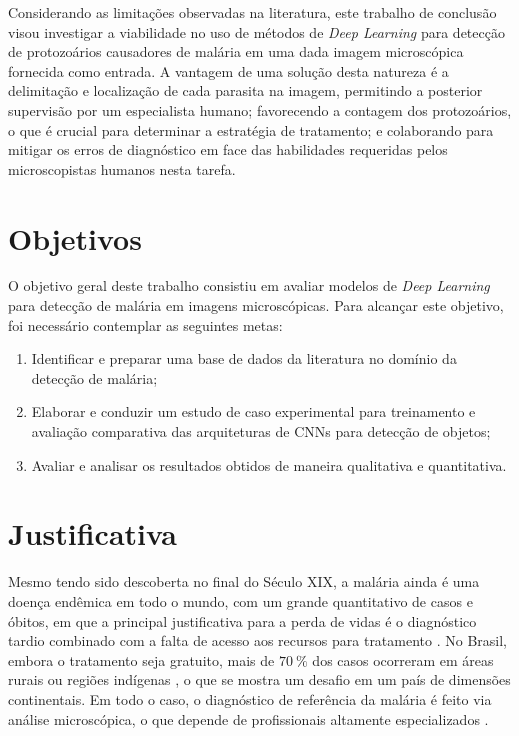Considerando as limitações observadas na literatura, este trabalho de conclusão visou investigar a viabilidade no uso de métodos de \emph{Deep Learning} para detecção de protozoários causadores de malária em uma dada imagem microscópica fornecida como entrada. A vantagem de uma solução desta natureza é a delimitação e localização de cada parasita na imagem, permitindo a posterior supervisão por um especialista humano; favorecendo a contagem dos protozoários, o que é crucial para determinar a estratégia de tratamento; e colaborando para mitigar os erros de diagnóstico em face das habilidades requeridas pelos microscopistas humanos nesta tarefa.

\section{Objetivos}

O objetivo geral deste trabalho consistiu em avaliar modelos de \emph{Deep Learning} para detecção de malária em imagens microscópicas. Para alcançar este objetivo, foi necessário contemplar as seguintes metas:

\begin{enumerate}
    \item Identificar e preparar uma base de dados da literatura no domínio da detecção de malária;
    \item Elaborar e conduzir um estudo de caso experimental para treinamento e avaliação comparativa das arquiteturas de CNNs para detecção de objetos;
    \item Avaliar e analisar os resultados obtidos de maneira qualitativa e quantitativa.
\end{enumerate}

\section{Justificativa}

Mesmo tendo sido descoberta no final do Século XIX, a malária ainda é uma doença endêmica em todo o mundo, com um grande quantitativo de casos e óbitos, em que a principal justificativa para a perda de vidas é o diagnóstico tardio combinado com a falta de acesso aos recursos para tratamento \cite{OMS:Malaria2019}. No Brasil, embora o tratamento seja gratuito,  mais de $\SI{70}{\percent}$ dos casos ocorreram em áreas rurais ou regiões indígenas \cite{Boletim:Malaria2022}, o que se mostra um desafio em um país de dimensões continentais. Em todo o caso, o diagnóstico de referência da malária é feito via análise microscópica, o que depende de profissionais altamente especializados \cite{Paz:Habilidade}.

